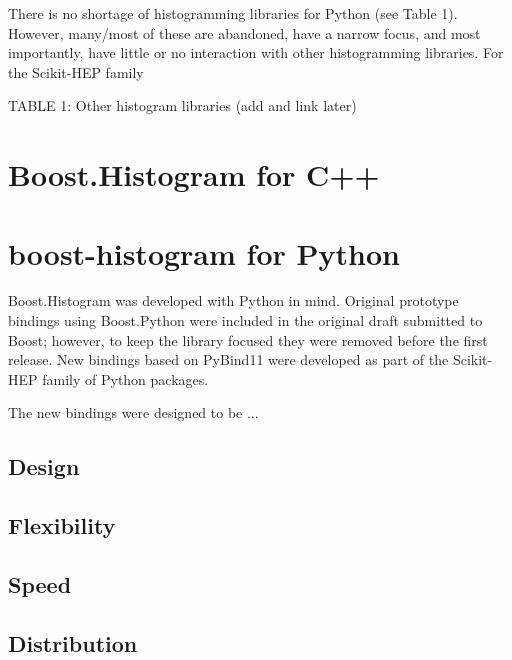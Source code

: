 \documentclass{webofc}
\begin{document}
There is no shortage of histogramming libraries for Python (see Table 1). However, many/most of these are abandoned, have a narrow focus, and most importantly, have little or no interaction with other histogramming libraries. For the Scikit-HEP family 

TABLE 1: Other histogram libraries (add and link later)

\section{Boost.Histogram for C++}
\label{sec-bh-cpp}

% 


\section{boost-histogram for Python}
\label{sec-bh-py}


Boost.Histogram was developed with Python in mind. Original prototype bindings using Boost.Python were included in the original draft submitted to Boost; however, to keep the library focused they were removed before the first release. New bindings based on PyBind11 were developed as part of the Scikit-HEP family of Python packages.

The new bindings were designed to be ...

\subsection{Design}
\subsection{Flexibility}
\subsection{Speed}
\subsection{Distribution}
\end{document}
